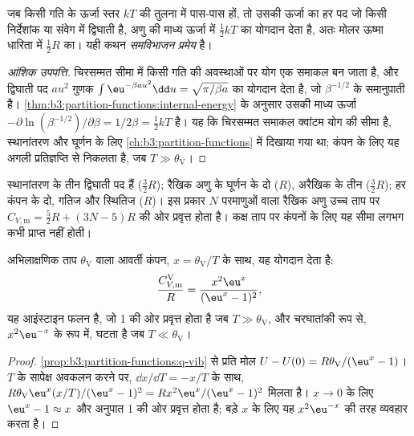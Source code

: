 \begin{theorem}[समविभाजन प्रमेय]\label{thm:b3:statistical-thermo-applied:equipartition}
जब किसी गति के ऊर्जा स्तर $kT$ की तुलना में पास-पास हों, तो उसकी ऊर्जा का हर
पद जो किसी निर्देशांक या संवेग में द्विघाती है, अणु की माध्य ऊर्जा में
$\frac12kT$ का योगदान देता है, अतः मोलर ऊष्मा
धारिता में $\frac12R$ का। यही कथन \emph{समविभाजन प्रमेय} है।
\end{theorem}

\begin{proof}[आंशिक उपपत्ति]
चिरसम्मत सीमा में किसी गति की अवस्थाओं पर योग एक
समाकल बन जाता है, और द्विघाती पद $a u^2$ गुणक $\int\eu^{-\beta au^2}\dd u =
\sqrt{\pi/\beta a}$ का योगदान देता है, जो $\beta^{-1/2}$ के समानुपाती है।
\cref{thm:b3:partition-functions:internal-energy} के अनुसार उसकी माध्य ऊर्जा
$-\partial\ln(\beta^{-1/2})/\partial\beta = 1/2\beta = \frac12kT$ है। यह कि चिरसम्मत समाकल क्वांटम योग की
सीमा है, स्थानांतरण और घूर्णन के लिए
\cref{ch:b3:partition-functions} में दिखाया गया था; कंपन के लिए यह अगली
प्रतिज्ञप्ति से निकलता है, जब $T \gg \theta_{\mathrm V}$।
\end{proof}

स्थानांतरण के तीन द्विघाती पद हैं ($\frac32R$); रैखिक
अणु के घूर्णन के दो ($R$), अरैखिक के तीन ($\frac32R$); हर कंपन के दो,
गतिज और स्थितिज ($R$)। इस प्रकार $N$ परमाणुओं वाला रैखिक अणु उच्च ताप पर
$C_{V,\mathrm m} = \frac52R + (3N - 5)R$ की ओर प्रवृत्त होता है। कक्ष ताप पर कंपनों के लिए यह सीमा लगभग कभी
प्राप्त नहीं होती।

\begin{proposition}[कंपनिक ऊष्मा धारिता]\label{prop:b3:statistical-thermo-applied:cv-vib}
अभिलाक्षणिक ताप $\theta_{\mathrm V}$ वाला आवर्ती कंपन,
$x = \theta_{\mathrm V}/T$ के साथ, यह योगदान देता है:
\[
  \frac{C_{V,\mathrm m}^{\mathrm V}}{R} = \frac{x^2\eu^x}{(\eu^x - 1)^2},
\]
यह आइंस्टाइन फलन है, जो 1 की ओर प्रवृत्त होता है जब $T \gg \theta_{\mathrm V}$, और
चरघातांकी रूप से, $x^2\eu^{-x}$ के रूप में, घटता है जब $T \ll \theta_{\mathrm V}$।
\end{proposition}

\begin{proof}
\cref{prop:b3:partition-functions:q-vib} से प्रति मोल $U - U(0) = R\theta_{\mathrm V}/(\eu^x - 1)$।
$T$ के सापेक्ष अवकलन करने पर, $\dd x/\dd T = -x/T$ के साथ,
$R\theta_{\mathrm V}\eu^x(x/T)/(\eu^x - 1)^2 = Rx^2\eu^x/(\eu^x - 1)^2$ मिलता है। $x \to 0$ के लिए $\eu^x - 1 \approx x$ और
अनुपात 1 की ओर प्रवृत्त होता है; बड़े $x$ के लिए यह $x^2\eu^{-x}$ की तरह व्यवहार करता है।
\end{proof}

